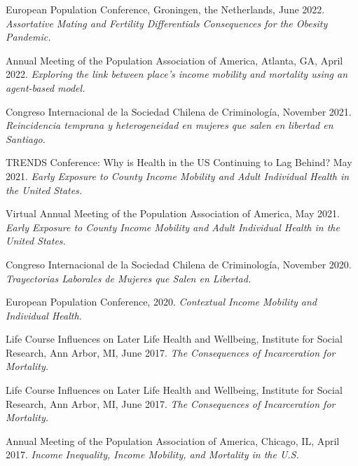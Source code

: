 \documentclass[10pt,letterpaper]{article}
\renewenvironment{itemize}{
  \begin{list}{}{
    \setlength{\leftmargin}{1.5em}
    \setlength{\itemsep}{0.25em}
    \setlength{\parskip}{0pt}
    \setlength{\parsep}{0.25em}
  }
}{
  \end{list}
}
\begin{document}
\begin{itemize}

\item European Population Conference, Groningen, the Netherlands, June 2022. {\textit{Assortative Mating and Fertility Differentials Consequences for the Obesity Pandemic.}}
  
\item  Annual Meeting of the Population Association of America, Atlanta, GA, April 2022. {\textit{Exploring the link between place’s income mobility and mortality using an agent-based model.}}

\item Congreso Internacional de la Sociedad Chilena de Criminología, November 2021. {\textit{Reincidencia temprana y heterogeneidad en mujeres que
salen en libertad en Santiago.}}

\item TRENDS Conference: Why is Health in the US Continuing to Lag Behind? May 2021. {\textit{Early Exposure to County Income Mobility and Adult Individual Health in the United States.}}

\item Virtual Annual Meeting of the Population Association of America, May 2021. {\textit{Early Exposure to County Income Mobility and Adult Individual Health in the United States.}}

\item Congreso Internacional de la Sociedad Chilena de Criminología, November 2020. {\textit{Trayectorias Laborales de Mujeres que Salen en
Libertad.}}

\item European Population Conference, 2020. {\textit{Contextual Income Mobility and Individual Health.}}

\item Life Course Influences on Later Life Health and Wellbeing, Institute for Social Research, Ann Arbor, MI, June 2017. {\textit{The Consequences of Incarceration for Mortality.}}


\item Life Course Influences on Later Life Health and Wellbeing, Institute for Social Research, Ann Arbor, MI, June 2017. {\textit{The Consequences of Incarceration for Mortality.}}


\item  Annual Meeting of the Population Association of America, Chicago, IL, April 2017. {\textit{Income Inequality, Income Mobility, and Mortality in the U.S.}}


\end{itemize}
\end{document}
